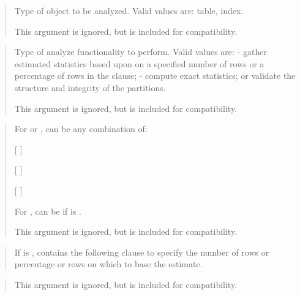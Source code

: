 \documentclass[letterpaper,10pt,english,openany,oneside]{sphinxmanual}
\begin{document}
\begin{quote}

Type of object to be analyzed. Valid values are:  \textendash{} table,  \textendash{} index.

This argument is ignored, but is included for compatibility.
\end{quote}

\begin{quote}

Type of analyze functionality to perform. Valid values are:  - gather
estimated statistics based upon on a specified number of rows or a
percentage of rows in the  clause;  - compute exact
statistics; or  \textendash{} validate the structure and integrity of the
partitions.

This argument is ignored, but is included for compatibility.
\end{quote}

\begin{quote}

For   or , can be any combination of:

{[}  {]}

{[}  {]}

{[}  {]}

For , can be  if  is .

This argument is ignored, but is included for compatibility.
\end{quote}

\begin{quote}

If  is , contains the following clause to specify the
number of rows or percentage or rows on which to base the estimate.
\end{quote}

\begin{quote}

This argument is ignored, but is included for compatibility.
\end{quote}
\end{document}
